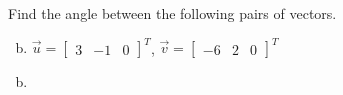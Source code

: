 \documentclass[../main.tex]{subfiles}
\begin{document}
Find the angle between the following pairs of vectors.
\begin{enumerate}[a)]
	\setcounter{enumi}{1}
	\item
		$\vec{u} = \begin{bmatrix}3&-1&0\end{bmatrix}^T$,
		$\vec{v} = \begin{bmatrix}-6&2&0\end{bmatrix}^T$
\end{enumerate}

\solution
\begin{enumerate}[a)]
	\setcounter{enumi}{1}
	\item 
\end{enumerate}
\end{document}
